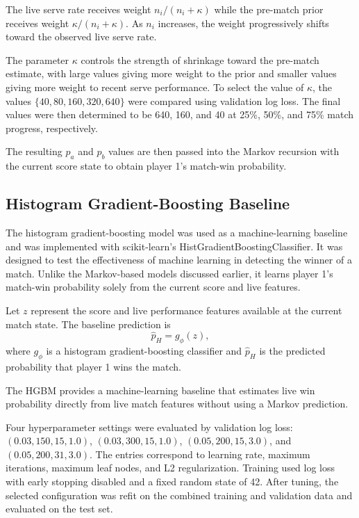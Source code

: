 \documentclass[10pt,twocolumn]{article}
\begin{document}
The live serve rate receives weight $n_i/(n_i+\kappa)$ while the pre-match prior receives weight $\kappa/(n_i+\kappa)$. As $n_i$ increases, the weight progressively shifts toward the observed live serve rate.

The parameter $\kappa$ controls the strength of shrinkage toward the pre-match estimate, with large values giving more weight to the prior and smaller values giving more weight to recent serve performance. To select the value of $\kappa$, the values $\{40,80,160,320,640\}$ were compared using validation log loss. The final values were then determined to be 640, 160, and 40 at 25\%, 50\%, and 75\% match progress, respectively.

The resulting $p_a$ and $p_b$ values are then passed into the Markov recursion with the current score state to obtain player 1's match-win probability.

\subsection{Histogram Gradient-Boosting Baseline}

The histogram gradient-boosting model was used as a machine-learning baseline and was implemented with scikit-learn's HistGradientBoostingClassifier.\cite{pedregosa2011} It was designed to test the effectiveness of machine learning in detecting the winner of a match. Unlike the Markov-based models discussed earlier, it learns player 1's match-win probability solely from the current score and live features.

Let $z$ represent the score and live performance features available at the current match state. The baseline prediction is
\begin{equation}
\hat{p}_H=g_{\phi}(z),
\end{equation}
where $g_{\phi}$ is a histogram gradient-boosting classifier and $\hat{p}_H$ is the predicted probability that player 1 wins the match.

The HGBM provides a machine-learning baseline that estimates live win probability directly from live match features without using a Markov prediction.

Four hyperparameter settings were evaluated by validation log loss: $(0.03,150,15,1.0)$, $(0.03,300,15,1.0)$, $(0.05,200,15,3.0)$, and $(0.05,200,31,3.0)$. The entries correspond to learning rate, maximum iterations, maximum leaf nodes, and L2 regularization. Training used log loss with early stopping disabled and a fixed random state of 42. After tuning, the selected configuration was refit on the combined training and validation data and evaluated on the test set.
\end{document}

